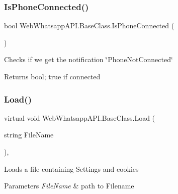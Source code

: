 \subsubsection{\texorpdfstring{Is\+Phone\+Connected()}{IsPhoneConnected()}}
{\footnotesize\ttfamily bool Web\+Whatsapp\+A\+P\+I.\+Base\+Class.\+Is\+Phone\+Connected (\begin{DoxyParamCaption}{ }\end{DoxyParamCaption})\hspace{0.3cm}{\ttfamily [inline]}}



Check\textquotesingle{}s if we get the notification \char`\"{}\+Phone\+Not\+Connected\char`\"{} 

\begin{DoxyReturn}{Returns}
bool; true if connected
\end{DoxyReturn}
\mbox{\label{class_web_whatsapp_a_p_i_1_1_base_class_a6e8b8b0fbf62bffb3e153f4003280626}} 
\subsubsection{\texorpdfstring{Load()}{Load()}}
{\footnotesize\ttfamily virtual void Web\+Whatsapp\+A\+P\+I.\+Base\+Class.\+Load (\begin{DoxyParamCaption}\item[{string}]{File\+Name }\end{DoxyParamCaption})\hspace{0.3cm}{\ttfamily [inline]}, {\ttfamily [virtual]}}



Loads a file containing Settings and cookies 


\begin{DoxyParams}{Parameters}
{\em File\+Name} & path to Filename\\
\hline
\end{DoxyParams}
\mbox{\label{class_web_whatsapp_a_p_i_1_1_base_class_a1da111623bfd6bee9401b049560e2646}} 
